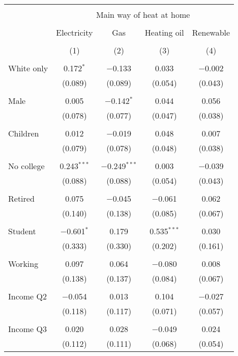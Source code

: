 
\begin{tabular}{@{\extracolsep{5pt}}lcccc} 
\\[-1.8ex]\hline 
\hline \\[-1.8ex] 
 & \multicolumn{4}{c}{Main way of heat at home} \\ 
\cline{2-5} 
\\[-1.8ex] & Electricity & Gas & Heating oil & Renewable \\ 
\\[-1.8ex] & (1) & (2) & (3) & (4)\\ 
\hline \\[-1.8ex] 
 White only & 0.172$^{*}$ & $-$0.133 & 0.033 & $-$0.002 \\ 
  & (0.089) & (0.089) & (0.054) & (0.043) \\ 
  & & & & \\ 
 Male & 0.005 & $-$0.142$^{*}$ & 0.044 & 0.056 \\ 
  & (0.078) & (0.077) & (0.047) & (0.038) \\ 
  & & & & \\ 
 Children & 0.012 & $-$0.019 & 0.048 & 0.007 \\ 
  & (0.079) & (0.078) & (0.048) & (0.038) \\ 
  & & & & \\ 
 No college & 0.243$^{***}$ & $-$0.249$^{***}$ & 0.003 & $-$0.039 \\ 
  & (0.088) & (0.088) & (0.054) & (0.043) \\ 
  & & & & \\ 
 Retired & 0.075 & $-$0.045 & $-$0.061 & 0.062 \\ 
  & (0.140) & (0.138) & (0.085) & (0.067) \\ 
  & & & & \\ 
 Student & $-$0.601$^{*}$ & 0.179 & 0.535$^{***}$ & 0.030 \\ 
  & (0.333) & (0.330) & (0.202) & (0.161) \\ 
  & & & & \\ 
 Working & 0.097 & 0.064 & $-$0.080 & 0.008 \\ 
  & (0.138) & (0.137) & (0.084) & (0.067) \\ 
  & & & & \\ 
 Income Q2 & $-$0.054 & 0.013 & 0.104 & $-$0.027 \\ 
  & (0.118) & (0.117) & (0.071) & (0.057) \\ 
  & & & & \\ 
 Income Q3 & 0.020 & 0.028 & $-$0.049 & 0.024 \\ 
  & (0.112) & (0.111) & (0.068) & (0.054) \\ 

\end{tabular}
